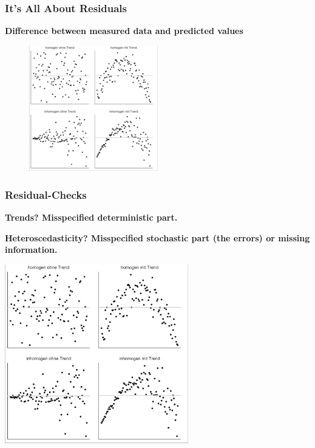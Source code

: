 \documentclass{beamer}
\begin{document}
\begin{frame}
    \frametitle{It's All About Residuals}
    \textbf{Difference between measured data and predicted values}
    
    \begin{figure}[h]
        \centering
        \includegraphics[width=0.5\textwidth]{lectures/day_2_LM_refresh_I/figures/residuals.png} 
    \end{figure}
\end{frame}

\begin{frame}
    \frametitle{Residual-Checks}
    \textbf{Trends? Misspecified deterministic part.}
    
    \textbf{Heteroscedasticity? Misspecified stochastic part (the errors) or missing information.}
    
    \begin{center}
        \includegraphics[width=0.6\textwidth]{lectures/day_2_LM_refresh_I/figures/residuals.png}
    \end{center}
\end{frame}

%       
\end{document}
